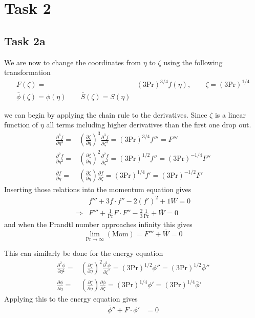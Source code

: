 \section*{Task 2} %
\label{sec:Task 2}
	\subsection*{Task 2a}
	We are now to change the coordinates from $\eta$ to $\zeta$ using the following transformation
	\begin{align*}
	  F(\zeta) =& (3\text{Pr})^{3/4} f(\eta), \qquad \zeta = (3 \text{Pr})^{1/4} \\
	  \bar{\phi}(\zeta) = \phi (\eta) \qquad \bar{S}(\zeta) = S(\eta )
	\end{align*}

	we can begin by applying the chain rule to the derivatives. Since $\zeta$ is a linear function of $\eta$ all terms including higher derivatives than the first one drop out.
	\begin{align*}
	  \frac{\partial^3 f}{\partial \eta^3}=& \left( \frac{\partial \zeta}{\partial \eta} \right)^3 \frac{\partial^3 f}{\partial \zeta^3}=(3 \text{Pr})^{3/4}f'''=F'''\\
	  \frac{\partial^2 f}{\partial \eta^2}=& \left( \frac{\partial \zeta}{\partial \eta} \right)^2 \frac{\partial^2 f}{\partial \zeta^2}=(3 \text{Pr})^{1/2}f''=(3 \text{Pr})^{-1/4} F''\\
	  \frac{\partial f}{\partial \eta}=& \left( \frac{\partial \zeta}{\partial \eta} \right) \frac{\partial f}{\partial \zeta}=(3 \text{Pr})^{1/4}f'=(3 \text{Pr})^{-1/2}F'
	\end{align*}
	Inserting those relations into the momentum equation gives
	\begin{align*}
	  &f'''+3f\cdot f'' -2(f')^2 + 1 \bar{W} = 0 \\
	  \Rightarrow& F''' +\frac{1}{\text{Pr}}F\cdot F'' -\frac{2}{3}\frac{1}{\text{Pr}}+\bar{W}=0 
	\end{align*}
	and when the Prandtl number approaches infinity this gives
	\begin{equation*}
	  \lim_{\text{Pr}\rightarrow \infty} (\text{Mom}) = F'''+\bar{W} =0
	\end{equation*}

	This can similarly be done for the energy equation
	\begin{align*}
	  \frac{\partial^2 \phi}{\partial \eta^2}=& \left( \frac{\partial \zeta}{\partial \eta} \right)^2 \frac{\partial^2 \phi}{\partial \zeta^2}=(3 \text{Pr})^{1/2}\phi'' =(3 \text{Pr})^{1/2}\bar{\phi}'' \\
	  \frac{\partial \phi}{\partial \eta}=& \left( \frac{\partial \zeta}{\partial \eta} \right) \frac{\partial \phi}{\partial \zeta}=(3 \text{Pr})^{1/4}\phi' =(3 \text{Pr})^{1/4}\bar{\phi}' 
	\end{align*}
	Applying this to the energy equation gives
	\begin{align*}
	  \bar{\phi}''+F\cdot\phi'&=0
	\end{align*}


